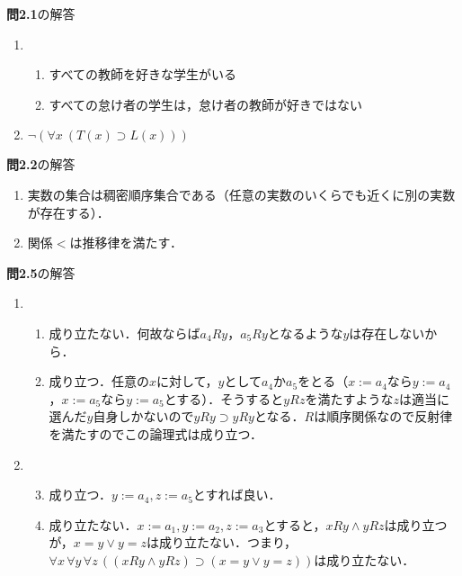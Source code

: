 \documentclass[11pt,dvipdfmx]{jreport}
\begin{document}
\renewcommand{\labelenumi}{(\arabic{enumi}) }
\renewcommand{\labelenumii}{\arabic{enumii}) }

\noindent \textbf{問2.1}の解答 
\begin{enumerate}
 \item
  \begin{enumerate}
   \item すべての教師を好きな学生がいる
   \item すべての怠け者の学生は，怠け者の教師が好きではない
  \end{enumerate}
 \item $\neg (\forall x \ (T(x) \supset L(x)))$
\end{enumerate}

\par
\vspace{5mm}

\noindent \textbf{問2.2}の解答 
\begin{enumerate}
 \item 実数の集合は稠密順序集合である（任意の実数のいくらでも近くに別の実数が存在する）．
 \item 関係$<$は推移律を満たす．
\end{enumerate}

\par
\vspace{5mm}

\noindent \textbf{問2.5}の解答 
\renewcommand{\labelenumi}{(\arabic{enumi}) }
\renewcommand{\labelenumii}{\arabic{enumii}) }
\begin{enumerate}
 \item 
  \begin{enumerate}
   \item 成り立たない．何故ならば$a_{4}Ry$，$a_{5}Ry$となるような$y$は存在しないから．
   \item 成り立つ．任意の$x$に対して，$y$として$a_{4}$か$a_{5}$をとる（$x := a_{4}$なら$y := a_{4}$，$x := a_{5}$なら$y := a_{5}$とする）．そうすると$yRz$を満たすような$z$は適当に選んだ$y$自身しかないので$yRy \supset yRy$となる．$R$は順序関係なので反射律を満たすのでこの論理式は成り立つ．
  \end{enumerate}
 \item 
　\begin{enumerate}
   \setcounter{enumii}{2}
   \item 成り立つ．$y := a_{4}, z := a_{5}$とすれば良い．
   \item 成り立たない．$x := a_{1}, y := a_{2}, z := a_{3}$とすると，$xRy \land yRz$は成り立つが，$x = y \lor y = z$は成り立たない．つまり，$\forall x \, \forall y \, \forall z \, ((xRy \land yRz) \supset (x=y \lor y = z))$は成り立たない．
 \end{enumerate}
\end{enumerate}
\end{document}
